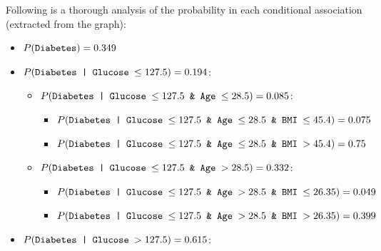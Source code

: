 \documentclass[12pt]{article}
\begin{document}
\begin{enumerate}[leftmargin=\labelsep, label=\textbf{\arabic*.)}]
\begin{enumerate}[label=\textbf{\roman*.)}]
                    Following is a thorough analysis of the probability in each conditional association (extracted from the graph):
                    \vspace{0.5em}
                    \begin{itemize}
                        \item $P( \text{\texttt{Diabetes}}) = 0.349$
                    \end{itemize}
                    \begin{itemize}
                        \item $P( \text{\texttt{Diabetes | Glucose $\leq 127.5$}}) = 0.194$:
                              \begin{itemize}
                                  \item $P( \text{\texttt{Diabetes | Glucose $\leq 127.5$ \& Age $\leq 28.5$}}) = 0.085$:
                                        \begin{itemize}
                                            \item $P( \text{\texttt{Diabetes | Glucose $\leq 127.5$ \& Age $\leq 28.5$ \& BMI $\leq 45.4$}}) = 0.075$
                                            \item $P( \text{\texttt{Diabetes | Glucose $\leq 127.5$ \& Age $\leq 28.5$ \& BMI $> 45.4$}}) = 0.75$
                                        \end{itemize}
                                  \item $P( \text{\texttt{Diabetes | Glucose $\leq 127.5$ \& Age $> 28.5$}}) = 0.332$:
                                        \begin{itemize}
                                            \item $P( \text{\texttt{Diabetes | Glucose $\leq 127.5$ \& Age $> 28.5$ \& BMI $\leq 26.35$}}) = 0.049$
                                            \item $P( \text{\texttt{Diabetes | Glucose $\leq 127.5$ \& Age $> 28.5$ \& BMI $> 26.35$}}) = 0.399$
                                        \end{itemize}
                              \end{itemize}
                    \end{itemize}
                    \begin{itemize}
                        \item $P( \text{\texttt{Diabetes | Glucose $> 127.5$}}) = 0.615$:
                              \begin{itemize}

\end{itemize}
\end{itemize}
\end{enumerate}
\end{enumerate}
\end{document}
